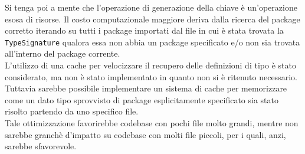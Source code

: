 Si tenga poi a mente che l'operazione di generazione della chiave è un'operazione esosa di risorse.
Il costo computazionale maggiore deriva dalla ricerca del package corretto iterando su tutti i package
importati dal file in cui è stata trovata la \texttt{TypeSignature} qualora essa non abbia un 
package specificato e/o non sia trovata all'interno del package corrente. \\

L'utilizzo di una cache per velocizzare il recupero delle definizioni di tipo è stato considerato,
ma non è stato implementato in quanto non si è ritenuto necessario. Tuttavia sarebbe possibile 
implementare un sistema di cache per memorizzare come un dato tipo sprovvisto di package esplicitamente 
specificato sia stato risolto partendo da uno specifico file. \\

Tale ottimizzazione favorirebbe codebase con pochi file molto grandi, mentre non sarebbe granchè d'impatto 
su codebase con molti file piccoli, per i quali, anzi, sarebbe sfavorevole. \\



